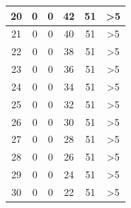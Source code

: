 \begin{longtable}{|c|c|c|c|c|c|}
	20                                           & 0                      & 0                     & 42                    & 51                     & >5                                        \\ \hline
	21                                           & 0                      & 0                     & 40                    & 51                     & >5                                               \\ \hline
	22                                           & 0                      & 0                     & 38                    & 51                     & >5                                        \\ \hline
	23                                           & 0                      & 0                     & 36                    & 51                     & >5                                        \\ \hline
	24                                           & 0                      & 0                     & 34                    & 51                     & >5                                                 \\ \hline
	25                                           & 0                      & 0                     & 32                    & 51                     & >5                                            \\ \hline
	26                                           & 0                      & 0                     & 30                    & 51                     & >5                                                 \\ \hline
	27                                           & 0                      & 0                     & 28                    & 51                     & >5                                        \\ \hline
	28                                           & 0                      & 0                     & 26                    & 51                     & >5                                        \\ \hline
	29                                           & 0                      & 0                     & 24                    & 51                     & >5                                              \\ \hline
	30                                           & 0                      & 0                     & 22                    & 51                     & >5                                        \\ \hline

\end{longtable}
